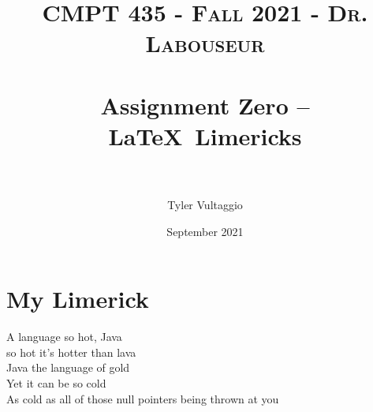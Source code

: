 \documentclass{article}
\title{	
   \normalfont \normalsize 
   \textsc{CMPT 435 - Fall 2021 - Dr. Labouseur} \\[10pt] %
   \horrule{0.5pt} \\[0.25cm] 	%
   \huge Assignment Zero -- \LaTeX ~Limericks \\     	    %
   \horrule{0.5pt} \\[0.25cm] 	%
}
\author{Tyler Vultaggio}
\date{September 2021}
\begin{document}
\maketitle

\section{My Limerick}

\noindent
\large A language so hot, Java \\
so hot it's hotter than lava \\
   \hspace*{1.5em} Java the language of gold\\
   \hspace*{1.5em} Yet it can be so cold\\
As cold as all of those null pointers being thrown at you\\
\end{document}

